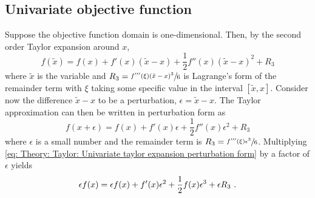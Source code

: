 \subsection{Univariate objective function}
\iffalse
The perturbation form of the second order Taylor approximation of the objective $f(\cdot)$ at $x+\epsilon$ is then
\begin{equation}\label{eq: Theory: Taylor: Univariate taylor expansion perturbation form}
    f(x+\epsilon) = f(x) + f'(x)\epsilon + \frac{1}{2}f''(x)\epsilon^2 + R_3
\end{equation}
for some small perturbation $\epsilon$ and $R_3=\sfrac{f'''(\xi)\epsilon^3}{6}$ is Lagrange's form of the remainder term and $\xi$ takes some specific value in the interval $[\tilde{x},x]$ . Setting $\tilde{x}=x+\epsilon$ recovers the regular Taylor expansion
\begin{equation}\label{eq: Theory: Taylor: Univariate taylor expansion}
        f(\tilde{x}) = f(x) + f'(x)(\tilde{x}-x) + \frac{1}{2}f''(x)(\tilde{x}-x)^2 + R_3
\end{equation}
where $\tilde{x}$ is the variable and $x$ is  the expansion point and $R_3=\sfrac{f'''(\xi)(\tilde{x}-x)^3}{6}$.
\fi
Suppose the objective function domain is one-dimensional. Then, by the second order Taylor expansion around $x$,
\begin{equation}\label{eq: Theory: Taylor: Univariate taylor expansion}
        f(\tilde{x}) = f(x) + f'(x)(\tilde{x}-x) + \frac{1}{2}f''(x)(\tilde{x}-x)^2 + R_3
\end{equation}
where $\tilde{x}$ is the variable and $R_3=\sfrac{f'''(\xi)(\tilde{x}-x)^3}{6}$ is Lagrange's form of the remainder term with $\xi$ taking some specific value in the interval $[\tilde{x},x]$. Consider now the difference $\tilde{x}-x$ to be a perturbation, $\epsilon = \tilde{x}-x$. The Taylor approximation can then be written in perturbation form as
\begin{equation}\label{eq: Theory: Taylor: Univariate taylor expansion perturbation form}
    f(x+\epsilon) = f(x) + f'(x)\epsilon + \frac{1}{2}f''(x)\epsilon^2 + R_3
\end{equation}
where $\epsilon$ is a small number and the remainder term is $R_3=\sfrac{f'''(\xi)\epsilon^3}{6}$. Multiplying \eqref{eq: Theory: Taylor: Univariate taylor expansion perturbation form} by a factor of $\epsilon$ yields
\begin{equation}\textbf{\label{eq: Theory: Taylor: Univariate taylor expansion perturbation form multiplied by epsilon}}
    \epsilon f(x) = \epsilon f(x) + f'(x)\epsilon^2 + \frac{1}{2}f(x)\epsilon^3 + \epsilon R_3 \ .
\end{equation}

